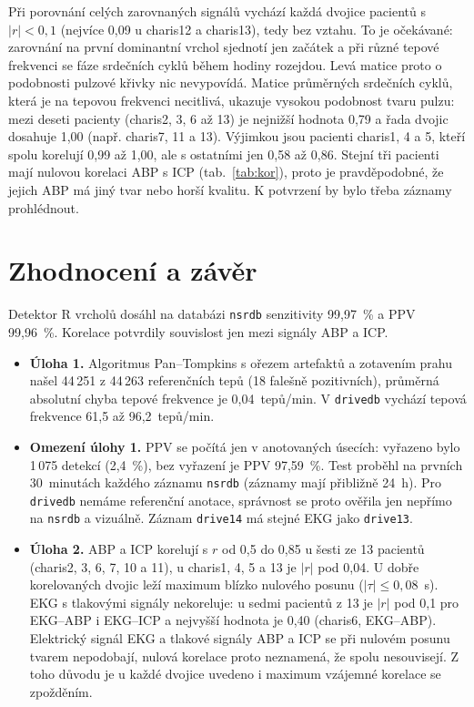 \documentclass[11pt,a4paper]{article}
\begin{document}
Při porovnání celých zarovnaných signálů vychází každá dvojice pacientů s $|r|<0{,}1$ (nejvíce 0,09 u charis12 a charis13), tedy bez vztahu. To je očekávané: zarovnání na první dominantní vrchol sjednotí jen začátek a při různé tepové frekvenci se fáze srdečních cyklů během hodiny rozejdou. Levá matice proto o podobnosti pulzové křivky nic nevypovídá. Matice průměrných srdečních cyklů, která je na tepovou frekvenci necitlivá, ukazuje vysokou podobnost tvaru pulzu: mezi deseti pacienty (charis2, 3, 6 až 13) je nejnižší hodnota 0,79 a řada dvojic dosahuje 1,00 (např. charis7, 11 a 13). Výjimkou jsou pacienti charis1, 4 a 5, kteří spolu korelují 0,99 až 1,00, ale s ostatními jen 0,58 až 0,86. Stejní tři pacienti mají nulovou korelaci ABP s ICP (tab.~\ref{tab:kor}), proto je pravděpodobné, že jejich ABP má jiný tvar nebo horší kvalitu. K potvrzení by bylo třeba záznamy prohlédnout.

\section{Zhodnocení a závěr}
Detektor R vrcholů dosáhl na databázi \texttt{nsrdb} senzitivity 99,97~\% a PPV 99,96~\%.
Korelace potvrdily souvislost jen mezi signály ABP a ICP.

\begin{itemize}
  \item \textbf{Úloha 1.} Algoritmus Pan--Tompkins s ořezem artefaktů a zotavením prahu našel
        44\,251 z 44\,263 referenčních tepů (18 falešně pozitivních), průměrná absolutní chyba
        tepové frekvence je 0,04~tepů/min. V \texttt{drivedb} vychází tepová frekvence 61,5 až
        96,2~tepů/min.
  \item \textbf{Omezení úlohy 1.} PPV se počítá jen v anotovaných úsecích: vyřazeno bylo 1\,075 detekcí
        (2,4~\%), bez vyřazení je PPV 97,59~\%. Test proběhl na prvních 30~minutách každého
        záznamu \texttt{nsrdb} (záznamy mají přibližně 24~h). Pro \texttt{drivedb} nemáme referenční anotace, správnost se proto
        ověřila jen nepřímo na \texttt{nsrdb} a vizuálně. Záznam \texttt{drive14} má stejné EKG
        jako \texttt{drive13}.
  \item \textbf{Úloha 2.} ABP a ICP korelují s $r$ od 0,5 do 0,85 u šesti ze 13 pacientů (charis2, 3,
        6, 7, 10 a 11), u charis1, 4, 5 a 13 je $|r|$ pod 0,04. U dobře korelovaných dvojic leží
        maximum blízko nulového posunu ($|\tau|\le 0{,}08$~s). EKG s tlakovými signály nekoreluje:
        u sedmi pacientů z 13 je $|r|$ pod 0,1 pro EKG--ABP i EKG--ICP a nejvyšší hodnota je
        0,40 (charis6, EKG--ABP). Elektrický signál EKG a tlakové signály ABP a ICP se při nulovém
        posunu tvarem nepodobají, nulová korelace proto neznamená, že spolu nesouvisejí.
        Z toho důvodu je u každé dvojice uvedeno i maximum vzájemné korelace se zpožděním.
\end{itemize}
\end{document}
